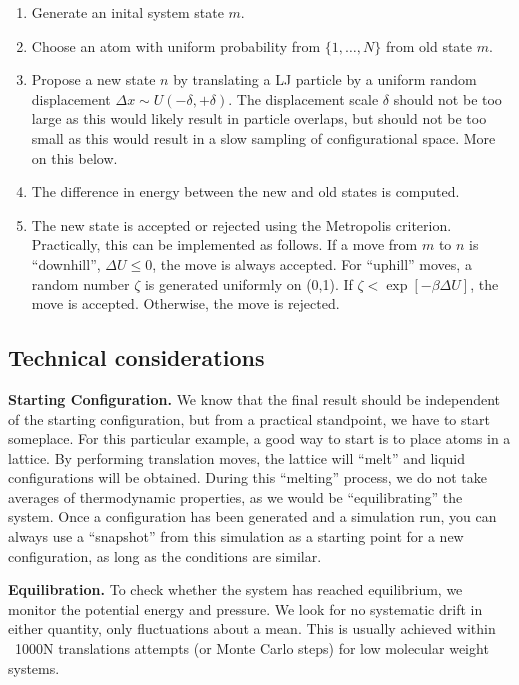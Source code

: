 \documentclass[aip,jcp,preprint,superscriptaddress,floatfix]{revtex4-1}
\begin{document}
\begin{enumerate}
\item Generate an inital system state $m$.
\item Choose an atom with uniform probability from $\{1, \ldots, N\}$ from old state $m$.
\item Propose a new state $n$ by translating a LJ particle by a uniform random displacement $\Delta x \sim U(-\delta, +\delta)$.
	The displacement scale $\delta$ should not be too large as this would
	likely result in particle overlaps, but should not be too small
	as this would result in a slow sampling of configurational space.
	More on this below.
\item The difference in energy between the new and old states is computed.
\item The new state is accepted or rejected using the Metropolis criterion.
	Practically, this can be implemented as follows. 
	If a move from $m$ to $n$ is ``downhill'', $\Delta U \leq 0$,
	the move is always accepted. For ``uphill'' moves, a random
	number $\zeta$ is generated uniformly on (0,1).  
	If $\zeta < \exp[-\beta {\Delta U}]$, the move is
	accepted.  Otherwise, the move is rejected. 
\end{enumerate}

\subsection{Technical considerations}

\textbf{Starting Configuration.} We
know that the final result should be independent of the starting
configuration, but from a practical standpoint, we have to start someplace. 
For this particular example, a good way to start is to place atoms
in a lattice. By performing translation moves, the lattice will ``melt''
and liquid configurations will be obtained. During this ``melting'' process, 
we do not take averages of thermodynamic properties, as we would be 
``equilibrating'' the system.
Once a configuration has been generated and a simulation run, you
can always use a ``snapshot'' from this simulation as a starting point for a
new configuration, as long as the conditions are similar.

\textbf{Equilibration.} To check whether the system has reached equilibrium, we 
monitor the potential energy and pressure.  We look for 
no systematic drift in either quantity, only 
fluctuations about a mean. This is usually achieved within ~1000N
translations attempts (or Monte Carlo steps) for low molecular weight
systems.
\end{document}
